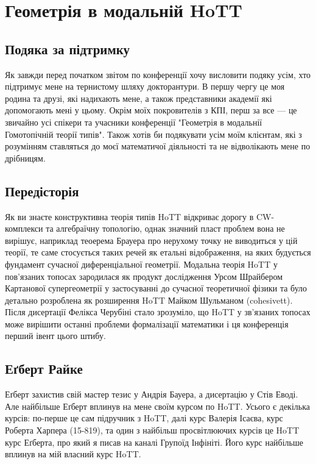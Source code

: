 \section{Геометрія в модальній HoTT}

\subsection*{Подяка за підтримку}

Як завжди перед початком звітом по конференції хочу висловити
подяку усім, хто підтримує мене на тернистому шляху докторантури.
В першу чергу це моя родина та друзі, які надихають мене, а також
представники академії які допомогають мені у цьому. Окрім моїх
покровителів з КПІ, перш за все --- це звичайно усі спікери та учасники
конференції "Геометрія в модальнії Гомотопічній теорії типів". Також хотів
би подякувати усім моїм клієнтам, які з розумінням ставляться до моєї
математичої діяльності та не відволікають мене по дрібницям.

\subsection*{Передісторія}

Як ви знаєте конструктивна теорія типів HoTT відкриває дорогу
в CW-комплекси та алгебраїчну топологію, однак значний пласт
проблем вона не вирішує, наприклад теоерема Брауера про нерухому
точку не виводиться у цій теорії, те саме стосується таких речей
як етальні відображення, на яких будується фундамент сучасної диференціальної
геометрії. Модальна теорія HoTT у пов'язаних топосах зародилася як
продукт дослідження Урсом Шрайбером Картанової супергеометрії у
застосуванні до сучасної теоретичної фізики та було детально розроблена
як розширення HoTT Майком Шульманом (cohesivett). Після дисертації Фелікса
Черубіні стало зрозуміло, що HoTT у зв'язаних топосах може вирішити
останні проблеми формалізації математики і ця конференція перший івент цього штибу.

\subsection*{Еґберт Райке}

Еґберт захистив свій мастер тезис у Андрія Бауера, а дисертацію
у Стів Еводі. Але найбільше Еґберт вплинув на мене своїм курсом
по HoTT. Усього є декілька курсів: по-перше це сам підручник з
HoTT, далі курс Валерія Ісаєва, курс Роберта Харпера (15-819),
та один з найбільш просвітлюючих курсів це HoTT курс Еґберта,
про який я писав на каналі Групоїд Інфініті. Його курс найбільше
вплинув на мій власний курс HoTT.

